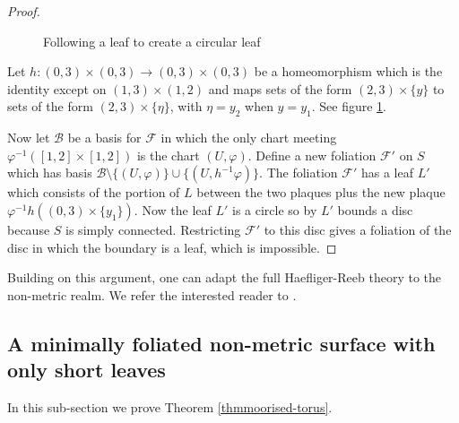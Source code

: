 \documentclass{amsart}
\begin{document}
\begin{proof}
\begin{figure}[h]
\centering
    \caption{\label{Following a leaf} Following a leaf to create a circular leaf}
\end{figure}

Let $h:(0,3)\times(0,3)\to(0,3)\times(0,3)$ be a homeomorphism which is the identity except on $(1,3)\times(1,2)$ and maps sets of the form $(2,3)\times\{y\}$ to sets of the form $(2,3)\times\{\eta\}$, with $\eta=y_2$ when $y=y_1$.  See figure \ref{Following a leaf}.

Now let $\mathcal B$ be a basis for $\mathcal F$ in which the only chart meeting $\varphi^{-1}([1,2]\times[1,2])$ is the chart $(U,\varphi)$. Define a new foliation $\mathcal F'$ on $S$ which has basis $\mathcal B\setminus\{(U,\varphi)\}\cup\{(U,h^{-1}\varphi)\}$. The foliation $\mathcal F'$ has a leaf $L'$ which consists of the portion of $L$ between the two plaques plus the new plaque $\varphi^{-1}h((0,3)\times\{y_1\})$. Now the leaf $L'$ is a circle so by \cite[Theorem 1]{GaGa} $L'$ bounds a disc because $S$ is simply connected. Restricting $\mathcal F'$ to this disc gives a foliation of the disc in which the boundary is a leaf, which is impossible.
\end{proof}

Building on this argument, one can adapt the full Haefliger-Reeb theory to the non-metric realm. We refer the interested reader to \cite{Gabard11}.

\subsection{A minimally foliated non-metric surface with only short leaves}\label{minimal-short}

In this sub-section we prove Theorem \ref{thmmoorised-torus}.
\end{document}
